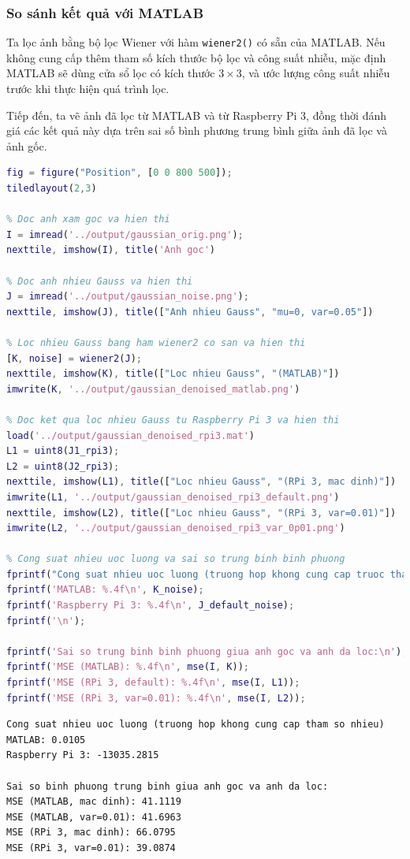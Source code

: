 \subsubsection{So sánh kết quả với MATLAB}

Ta lọc ảnh bằng bộ lọc Wiener với hàm \texttt{wiener2()} có sẵn của MATLAB. 
Nếu không cung cấp thêm tham số kích thước bộ lọc và công suất nhiễu,
mặc định MATLAB sẽ dùng cửa sổ lọc có kích thước $3 \times 3$, 
và ước lượng công suất nhiễu trước khi thực hiện quá trình lọc.

Tiếp đến, ta vẽ ảnh đã lọc từ MATLAB và từ Raspberry Pi 3, 
đồng thời đánh giá các kết quả này dựa trên sai số bình phương trung bình giữa ảnh đã lọc và ảnh gốc.

\begin{lstlisting}[language=MATLAB]
fig = figure("Position", [0 0 800 500]);
tiledlayout(2,3)

% Doc anh xam goc va hien thi
I = imread('../output/gaussian_orig.png');
nexttile, imshow(I), title('Anh goc')

% Doc anh nhieu Gauss va hien thi
J = imread('../output/gaussian_noise.png');
nexttile, imshow(J), title(["Anh nhieu Gauss", "mu=0, var=0.05"])

% Loc nhieu Gauss bang ham wiener2 co san va hien thi
[K, noise] = wiener2(J);
nexttile, imshow(K), title(["Loc nhieu Gauss", "(MATLAB)"])
imwrite(K, '../output/gaussian_denoised_matlab.png')

% Doc ket qua loc nhieu Gauss tu Raspberry Pi 3 va hien thi
load('../output/gaussian_denoised_rpi3.mat')
L1 = uint8(J1_rpi3);
L2 = uint8(J2_rpi3);
nexttile, imshow(L1), title(["Loc nhieu Gauss", "(RPi 3, mac dinh)"])
imwrite(L1, '../output/gaussian_denoised_rpi3_default.png')
nexttile, imshow(L2), title(["Loc nhieu Gauss", "(RPi 3, var=0.01)"])
imwrite(L2, '../output/gaussian_denoised_rpi3_var_0p01.png')

% Cong suat nhieu uoc luong va sai so trung binh binh phuong
fprintf("Cong suat nhieu uoc luong (truong hop khong cung cap truoc tham so nhieu):\n");
fprintf('MATLAB: %.4f\n', K_noise);
fprintf('Raspberry Pi 3: %.4f\n', J_default_noise);
fprintf('\n');

fprintf('Sai so trung binh binh phuong giua anh goc va anh da loc:\n');
fprintf('MSE (MATLAB): %.4f\n', mse(I, K));
fprintf('MSE (RPi 3, default): %.4f\n', mse(I, L1));
fprintf('MSE (RPi 3, var=0.01): %.4f\n', mse(I, L2));
\end{lstlisting}

\begin{lstlisting}[style=output]
Cong suat nhieu uoc luong (truong hop khong cung cap tham so nhieu)
MATLAB: 0.0105
Raspberry Pi 3: -13035.2815

Sai so binh phuong trung binh giua anh goc va anh da loc:
MSE (MATLAB, mac dinh): 41.1119
MSE (MATLAB, var=0.01): 41.6963
MSE (RPi 3, mac dinh): 66.0795
MSE (RPi 3, var=0.01): 39.0874
\end{lstlisting}

